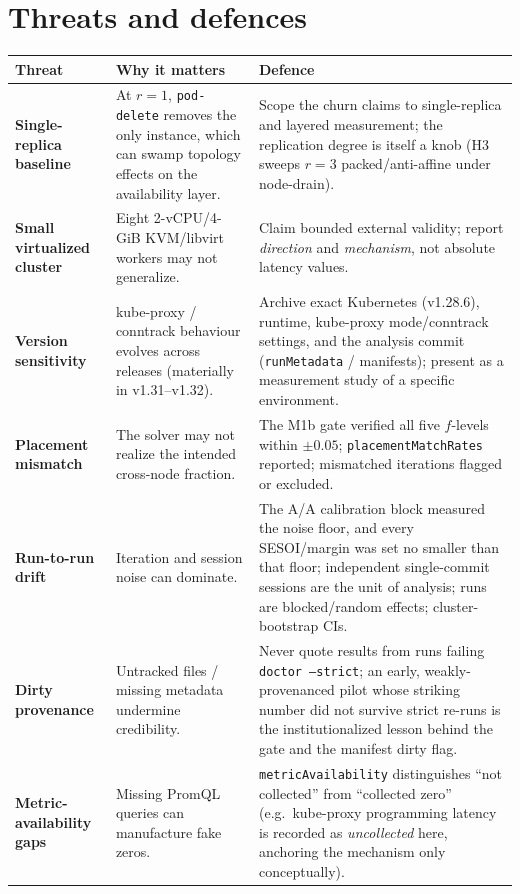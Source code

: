 \section{Threats and defences}\label{sec:threats-table}

\begin{center}
\footnotesize
\begin{tabular}{p{}p{}p{}}
\toprule
\textbf{Threat} & \textbf{Why it matters} & \textbf{Defence} \\
\midrule
\textbf{Single-replica baseline} & At $r{=}1$, \texttt{pod-delete} removes the only instance, which can swamp topology effects on the availability layer. & Scope the churn claims to single-replica and layered measurement; the replication degree is itself a knob (H3 sweeps $r{=}3$ packed/anti-affine under node-drain). \\
\addlinespace
\textbf{Small virtualized cluster} & Eight 2-vCPU/4-GiB KVM/libvirt workers may not generalize. & Claim bounded external validity; report \emph{direction} and \emph{mechanism}, not absolute latency values. \\
\addlinespace
\textbf{Version sensitivity} & kube-proxy / conntrack behaviour evolves across releases (materially in v1.31--v1.32). & Archive exact Kubernetes (v1.28.6), runtime, kube-proxy mode/conntrack settings, and the analysis commit (\texttt{runMetadata} / manifests); present as a measurement study of a specific environment. \\
\addlinespace
\textbf{Placement mismatch} & The solver may not realize the intended cross-node fraction. & The M1b gate verified all five $f$-levels within $\pm 0.05$; \texttt{placementMatchRates} reported; mismatched iterations flagged or excluded. \\
\addlinespace
\textbf{Run-to-run drift} & Iteration and session noise can dominate. & The A/A calibration block measured the noise floor, and every SESOI/margin was set no smaller than that floor; independent single-commit sessions are the unit of analysis; runs are blocked/random effects; cluster-bootstrap CIs. \\
\addlinespace
\textbf{Dirty provenance} & Untracked files / missing metadata undermine credibility. & Never quote results from runs failing \texttt{doctor --strict}; an early, weakly-provenanced pilot whose striking number did not survive strict re-runs is the institutionalized lesson behind the gate and the manifest dirty flag. \\
\addlinespace
\textbf{Metric-availability gaps} & Missing PromQL queries can manufacture fake zeros. & \texttt{metricAvailability} distinguishes ``not collected'' from ``collected zero'' (e.g.\ kube-proxy programming latency is recorded as \emph{uncollected} here, anchoring the mechanism only conceptually). \\

\end{tabular}
\end{center}
